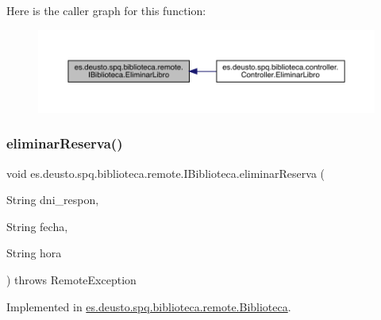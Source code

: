 Here is the caller graph for this function\+:
\nopagebreak
\begin{figure}[H]
\begin{center}
\leavevmode
\includegraphics[width=350pt]{interfacees_1_1deusto_1_1spq_1_1biblioteca_1_1remote_1_1_i_biblioteca_addbe4ccd7324f0302e25447f2be3403a_icgraph}
\end{center}
\end{figure}
\mbox{\label{interfacees_1_1deusto_1_1spq_1_1biblioteca_1_1remote_1_1_i_biblioteca_abb2449f5cc79a04e38cb5898cea35ffc}} 
\subsubsection{\texorpdfstring{eliminar\+Reserva()}{eliminarReserva()}}
{\footnotesize\ttfamily void es.\+deusto.\+spq.\+biblioteca.\+remote.\+I\+Biblioteca.\+eliminar\+Reserva (\begin{DoxyParamCaption}\item[{String}]{dni\+\_\+respon,  }\item[{String}]{fecha,  }\item[{String}]{hora }\end{DoxyParamCaption}) throws Remote\+Exception}



Implemented in \mbox{\hyperlink{classes_1_1deusto_1_1spq_1_1biblioteca_1_1remote_1_1_biblioteca_a99ad677b2d619ad4b0560daa40f351db}{es.\+deusto.\+spq.\+biblioteca.\+remote.\+Biblioteca}}.

